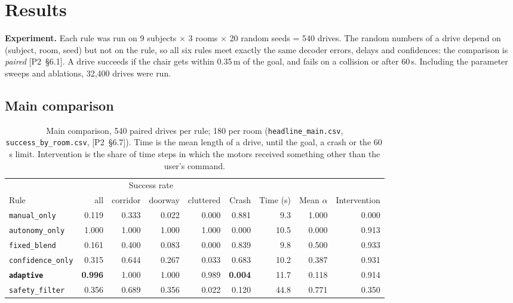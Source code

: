 \documentclass[11pt,a4paper]{article}
\newcommand{\ptwo}[1]{{\small\textsf{[P2~\S#1]}}}
\newcommand{\code}[1]{\texttt{#1}}
\begin{document}
\section{Results}

\textbf{Experiment.} Each rule was run on 9 subjects $\times$ 3 rooms
$\times$ 20 random seeds = 540 drives. The random numbers of a drive
depend on (subject, room, seed) but not on the rule, so all six rules
meet exactly the same decoder errors, delays and confidences: the
comparison is \emph{paired} \ptwo{6.1}. A drive succeeds if the chair gets
within 0.35\,m of the goal, and fails on a collision or after 60\,s.
Including the parameter sweeps and ablations, 32,400 drives were run.

\subsection{Main comparison}

\begin{table}[H]
\centering\small
\begin{tabular}{@{}lrrrrrrrr@{}}
\toprule
 & \multicolumn{4}{c}{Success rate} & & & & \\
\cmidrule(lr){2-5}
Rule & all & corridor & doorway & cluttered & Crash & Time (s) & Mean $\alpha$ & Intervention \\
\midrule
\code{manual\_only}     & 0.119 & 0.333 & 0.022 & 0.000 & 0.881 & 9.3  & 1.000 & 0.000 \\
\code{autonomy\_only}   & 1.000 & 1.000 & 1.000 & 1.000 & 0.000 & 10.5 & 0.000 & 0.913 \\
\code{fixed\_blend}     & 0.161 & 0.400 & 0.083 & 0.000 & 0.839 & 9.8  & 0.500 & 0.933 \\
\code{confidence\_only} & 0.315 & 0.644 & 0.267 & 0.033 & 0.683 & 10.2 & 0.387 & 0.931 \\
\textbf{\code{adaptive}} & \textbf{0.996} & 1.000 & 1.000 & 0.989 & \textbf{0.004} & 11.7 & 0.118 & 0.914 \\
\code{safety\_filter}   & 0.356 & 0.689 & 0.356 & 0.022 & 0.120 & 44.8 & 0.771 & 0.350 \\
\bottomrule
\end{tabular}
\caption{Main comparison, 540 paired drives per rule; 180 per room
(\code{headline\_main.csv}, \code{success\_by\_room.csv}, \ptwo{6.7}).
Time is the mean length of a drive, until the goal, a crash or the 60\,s limit. Intervention is the share of time steps in
which the motors received something other than the user's command.}
\label{tab:headline}
\end{table}
\end{document}

